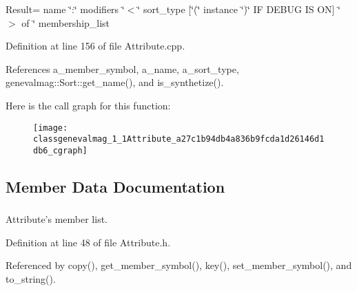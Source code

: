 Result= name \char`\"{}:\char`\"{} modifiers \char`\"{}$<$\char`\"{} sort\_\-type \mbox{[}\char`\"{}(\char`\"{} instance \char`\"{})\char`\"{} IF DEBUG IS ON\mbox{]} \char`\"{}$>$ of \char`\"{} membership\_\-list 

Definition at line 156 of file Attribute.cpp.



References a\_\-member\_\-symbol, a\_\-name, a\_\-sort\_\-type, genevalmag::Sort::get\_\-name(), and is\_\-synthetize().



Here is the call graph for this function:\nopagebreak
\begin{figure}[H]
\begin{center}
\leavevmode
\texttt{[image: classgenevalmag\_1\_1Attribute\_a27c1b94db4a836b9fcda1d26146d1db6\_cgraph]}
\end{center}
\end{figure}




\subsection{Member Data Documentation}
\hypertarget{classgenevalmag_1_1Attribute_ac7e7d8421dcb4aa5678dee2133ec0a9b}{
\subsubsection[{a\_\-member\_\-symbol}]{}}
\label{classgenevalmag_1_1Attribute_ac7e7d8421dcb4aa5678dee2133ec0a9b}


Attribute's member list. 



Definition at line 48 of file Attribute.h.



Referenced by copy(), get\_\-member\_\-symbol(), key(), set\_\-member\_\-symbol(), and to\_\-string().

\hypertarget{classgenevalmag_1_1Attribute_acd49e385c2137cf59f4ab5eec1a5b4d3}{
\subsubsection[{a\_\-mod\_\-type}]{}}
\label{classgenevalmag_1_1Attribute_acd49e385c2137cf59f4ab5eec1a5b4d3}


